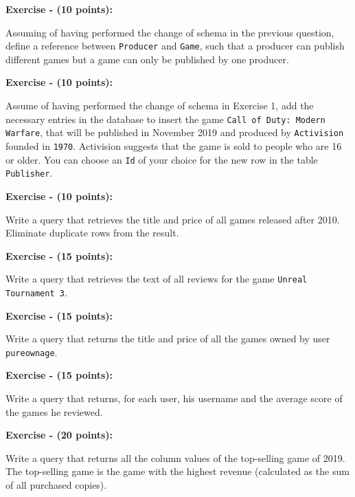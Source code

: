 \documentclass[10pt,a4paper]{article}
\newcounter{ExerciseCount}
\newcommand{\exercise}[2]{\noindent \textbf{Exercise \theExerciseCount \space - (#2 points):}
  
  \vspace{0.15cm}
  \noindent
 #1 \addtocounter{ExerciseCount}{1}
}
\begin{document}
\vspace{0.5cm}
\exercise{
Assuming of having performed the change of schema in the previous question, define a reference between \texttt{Producer} and \texttt{Game}, such that a producer can publish different games but a game can only be published by one producer.
}{10}

\vspace{0.5cm}
\exercise{
Assume of having performed the change of schema in Exercise 1, add the necessary entries in the database to insert the game \texttt{Call of Duty: Modern Warfare}, that will be published in November 2019 and produced by \texttt{Activision} founded in \texttt{1970}. Activision suggests that the game is sold to people who are 16 or older. You can choose an \texttt{Id} of your choice for the new row in the table \texttt{Publisher}.
}{10}

\vspace{0.5cm}
\exercise{
Write a query that retrieves the title and price of all games released after 2010. Eliminate duplicate rows from the result.
}{10}

\vspace{0.5cm}
\exercise{
Write a query that retrieves the text of all reviews for the game \texttt{Unreal Tournament 3}.
}{15}

\vspace{0.5cm}
\exercise{
Write a query that returns the title and price of all the games owned by user \texttt{pureownage}.
}{15}

\vspace{0.5cm}
\exercise{
Write a query that returns, for each user, his username and the average score of the games he reviewed.
}{15}

\vspace{0.5cm}
\exercise{
Write a query that returns all the column values of the top-selling game of 2019. The top-selling game is the game with the highest revenue (calculated as the sum of all purchased copies).
}{20}
\end{document}
